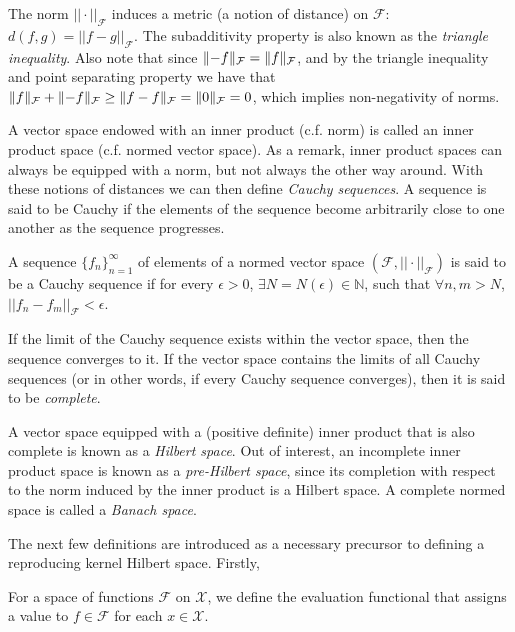 \documentclass[a4paper,showframe,11pt,draft]{report}
\begin{document}
The norm $||\cdot||_{\mathcal F}$ induces a metric (a notion of distance) on $\mathcal F$: $d(f,g) = ||f-g||_{\mathcal F}$.
The subadditivity property is also known as the \emph{triangle inequality}.
Also note that since $\lVert-f\rVert_{\mathcal F} = \lVert f\rVert_{\mathcal F}$, and by the triangle inequality and point separating property we have that $\lVert f\rVert_{\mathcal F} + \lVert-f\rVert_{\mathcal F} \geq \lVert f - f\rVert_{\mathcal F} = \lVert0\rVert_{\mathcal F} = 0$, which implies non-negativity of norms.

A vector space endowed with an inner product (c.f. norm) is called an inner product space (c.f. normed vector space).
As a remark, inner product spaces can always be equipped with a norm, but not always the other way around.
With these notions of distances we can then define \emph{Cauchy sequences}.
A sequence is said to be Cauchy if the elements of the sequence become arbitrarily close to one another as the sequence progresses.

\begin{definition}
	A sequence $\{f_n\}_{n=1}^\infty$ of elements of a normed vector space $(\mathcal F, ||\cdot ||_{\mathcal F})$ is said to be a Cauchy sequence if for every $\epsilon > 0$, $\exists N=N(\epsilon) \in \mathbb N$, such that $\forall n,m > N$, $||f_n - f_m||_{\mathcal F} < \epsilon$.
\end{definition}

If the limit of the Cauchy sequence exists within the vector space, then the sequence converges to it.
If the vector space contains the limits of all Cauchy sequences (or in other words, if every Cauchy sequence converges), then it is said to be \emph{complete}.

A vector space equipped with a (positive definite) inner product that is also complete is known as a \emph{Hilbert space}. 
Out of interest, an incomplete inner product space is known as a \emph{pre-Hilbert space}, since its completion with respect to the norm induced by the inner product is a Hilbert space.
A complete normed space is called a \emph{Banach space}.

The next few definitions are introduced as a necessary precursor to defining a reproducing kernel Hilbert space.
Firstly,


For a space of functions $\mathcal F$ on $\mathcal X$, we define the evaluation functional that assigns a value to $f \in \mathcal F$ for each $x \in \mathcal X$.
\end{document}
